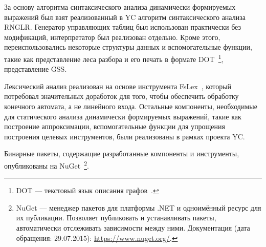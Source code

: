 За основу алгоритма синтаксического анализа динамически формируемых выражений был взят реализованный в YC алгоритм синтаксического анализа RNGLR. Генератор управляющих таблиц был использован практически без 
модификаций, интерпретатор был реализован отдельно. Кроме этого, переиспользовались некоторые структуры данных и вспомогательные функции, такие как представление леса разбора и его печать в формате 
DOT~\footnote{DOT --- текстовый язык описания графов~\cite{DOT}.}, представление GSS. 

Лексический анализ реализован на основе инструмента FsLex~\cite{FsLex}, который потребовал значительных доработок для того, чтобы обеспечить обработку конечного автомата, а не линейного входа. Остальные компоненты, 
необходимые для статического анализа динамически формируемых выражений, такие как построение аппроксимации, вспомогательные функции для упрощения построения целевых инструментов, были реализованы в рамках проекта YC.

Бинарные пакеты, содержащие разработанные компоненты и инструменты, опубликованы на NuGet~\footnote{NuGet --- менеджер пакетов для платформы .NET и одноимённый ресурс для их публикации. Позволяет публиковать 
и устанавливать пакеты, автоматически отслеживать зависимости между ними. Документация (дата обращения: 29.07.2015): \url{https://www.nuget.org/}.}.
